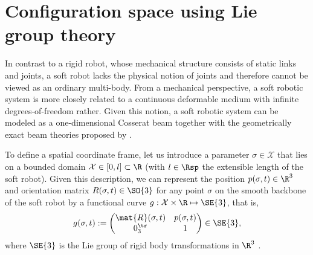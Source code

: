 \section*{Configuration space using Lie group theory}
In contrast to a rigid robot, whose mechanical structure consists of static links and joints, a soft robot lacks the physical notion of joints and therefore cannot be viewed as an ordinary multi-body. From a mechanical perspective, a soft robotic system is more closely related to a continuous deformable medium with infinite degrees-of-freedom rather.
Given this notion, a soft robotic system can be modeled as a one-dimensional Cosserat beam together with the geometrically exact beam theories proposed by \cite{Simo1986}. 

To define a spatial coordinate frame, let us introduce a parameter $\sigma \in \mathcal{X}$ that lies on a bounded domain $\mathcal{X} \in [0, l] \subset \R$ (with $l \in \Rsp$ the extensible length of the soft robot). Given this description, we can represent the position $p(\sigma,t) \in \R^3$ and orientation matrix $R(\sigma,t) \in \SO{3}$ for any point $\sigma$ on the smooth backbone of the soft robot by a functional curve $g: \mathcal{X} \times \R \mapsto \SE{3}$, that is, 
\begin{equation}
g(\sigma,t) := \begin{pmatrix}
\mat{R}(\sigma,t) & p(\sigma,t) \\ 0_{3}^\tr & 1 
\end{pmatrix} \in \SE{3},
\label{eq:g}
\end{equation}
where $\SE{3}$ is the Lie group of rigid body transformations in $\R^3$ \cite{Murray1994,Spong2006}. 

